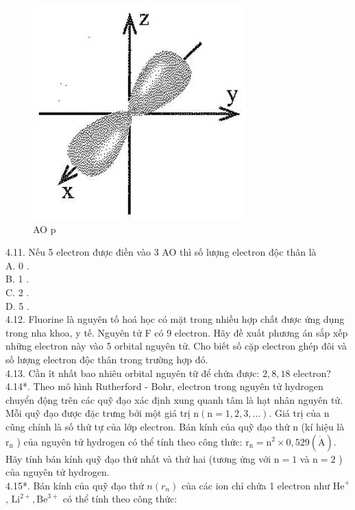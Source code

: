 \documentclass[10pt]{article}
\def\AA{\mathring{\mathrm{A}}}
\begin{document}
\begin{figure}[h]
\begin{center}
  \includegraphics[width=\textwidth]{2025_10_23_76620c17ffac1ae9b35bg-09}
\captionsetup{labelformat=empty}
\caption{AO p}
\end{center}
\end{figure}

4.11. Nếu 5 electron được điền vào 3 AO thì số lượng electron độc thân là\\
A. 0 .\\
B. 1 .\\
C. 2 .\\
D. 5 .\\
4.12. Fluorine là nguyên tố hoá học có mặt trong nhiều hợp chất được ứng dụng trong nha khoa, y tế. Nguyên tử F có 9 electron. Hãy đề xuất phương án sắp xếp những electron này vào 5 orbital nguyên tử. Cho biết số cặp electron ghép đôi và số lượng electron độc thân trong trường hợp đó.\\
4.13. Cần ît nhất bao nhiêu orbital nguyên tữ để chứa được: $2,8,18$ electron?\\
4.14*. Theo mô hình Rutherford - Bohr, electron trong nguyên tử hydrogen chuyển động trên các quỹ đạo xác định xung quanh tâm là hạt nhân nguyên tử. Mỗi quỹ đạo được đặc trưng bởi một giá trị $\mathrm{n}(\mathrm{n}=1,2,3, \ldots)$. Giá trị của n cũng chính là số thứ tự của lớp electron. Bán kính của quỹ đạo thứ n (kí hiệu là $\mathrm{r}_{\mathrm{n}}$ ) của nguyên tử hydrogen có thể tính theo công thức: $\mathrm{r}_{\mathrm{n}}=\mathrm{n}^{2} \times 0,529(\AA)$. Hãy tính bán kính quỹ đạo thứ nhất và thứ hai (tương ứng với $\mathrm{n}=1$ và $\mathrm{n}=2$ ) của nguyên tử hydrogen.\\
4.15*. Bán kính của quỹ đạo thứ $n\left(r_{n}\right)$ của các ion chỉ chứa 1 electron như $\mathrm{He}^{+}$, $\mathrm{Li}^{2+}, \mathrm{Be}^{3+}$ có thể tính theo công thức:
\end{document}
